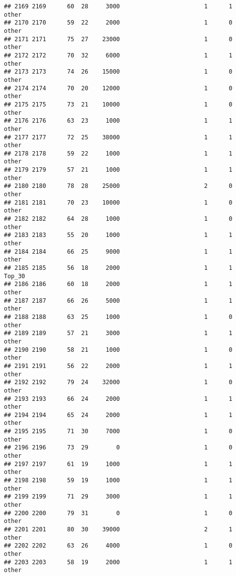 \documentclass[
]{article}
\begin{document}
\begin{verbatim}
## 2169 2169      60  28     3000                        1      1    other
## 2170 2170      59  22     2000                        1      0    other
## 2171 2171      75  27    23000                        1      0    other
## 2172 2172      70  32     6000                        1      1    other
## 2173 2173      74  26    15000                        1      0    other
## 2174 2174      70  20    12000                        1      0    other
## 2175 2175      73  21    10000                        1      0    other
## 2176 2176      63  23     1000                        1      1    other
## 2177 2177      72  25    38000                        1      1    other
## 2178 2178      59  22     1000                        1      1    other
## 2179 2179      57  21     1000                        1      1    other
## 2180 2180      78  28    25000                        2      0    other
## 2181 2181      70  23    10000                        1      0    other
## 2182 2182      64  28     1000                        1      0    other
## 2183 2183      55  20     1000                        1      1    other
## 2184 2184      66  25     9000                        1      1    other
## 2185 2185      56  18     2000                        1      1   Top_30
## 2186 2186      60  18     2000                        1      1    other
## 2187 2187      66  26     5000                        1      1    other
## 2188 2188      63  25     1000                        1      0    other
## 2189 2189      57  21     3000                        1      1    other
## 2190 2190      58  21     1000                        1      0    other
## 2191 2191      56  22     2000                        1      1    other
## 2192 2192      79  24    32000                        1      0    other
## 2193 2193      66  24     2000                        1      1    other
## 2194 2194      65  24     2000                        1      1    other
## 2195 2195      71  30     7000                        1      0    other
## 2196 2196      73  29        0                        1      0    other
## 2197 2197      61  19     1000                        1      1    other
## 2198 2198      59  19     1000                        1      1    other
## 2199 2199      71  29     3000                        1      1    other
## 2200 2200      79  31        0                        1      0    other
## 2201 2201      80  30    39000                        2      1    other
## 2202 2202      63  26     4000                        1      0    other
## 2203 2203      58  19     2000                        1      1    other

\end{verbatim}
\end{document}
